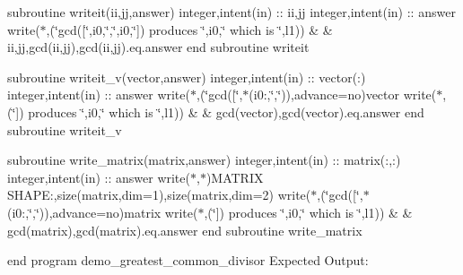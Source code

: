 subroutine writeit(ii,jj,answer) integer,intent(in) \+:\+: ii,jj integer,intent(in) \+:\+: answer write($\ast$,\textquotesingle{}(\char`\"{}gcd(\mbox{[}\char`\"{},i0,\char`\"{},\char`\"{},i0,\char`\"{}\mbox{]}) produces \char`\"{},i0,\char`\"{} which is \char`\"{},l1)\textquotesingle{}) \& \& ii,jj,gcd(ii,jj),gcd(ii,jj).eq.\+answer end subroutine writeit

subroutine writeit\+\_\+v(vector,answer) integer,intent(in) \+:\+: vector(\+:) integer,intent(in) \+:\+: answer write($\ast$,\textquotesingle{}(\char`\"{}gcd(\mbox{[}\char`\"{},$\ast$(i0\+:,\char`\"{},\char`\"{}))\textquotesingle{},advance=\textquotesingle{}no\textquotesingle{})vector write($\ast$,\textquotesingle{}(\char`\"{}\mbox{]}) produces \char`\"{},i0,\char`\"{} which is \char`\"{},l1)\textquotesingle{}) \& \& gcd(vector),gcd(vector).eq.\+answer end subroutine writeit\+\_\+v

subroutine write\+\_\+matrix(matrix,answer) integer,intent(in) \+:\+: matrix(\+:,\+:) integer,intent(in) \+:\+: answer write($\ast$,$\ast$)\textquotesingle{}M\+A\+T\+R\+IX S\+H\+A\+PE\+:\textquotesingle{},size(matrix,dim=1),size(matrix,dim=2) write($\ast$,\textquotesingle{}(\char`\"{}gcd(\mbox{[}\char`\"{},$\ast$(i0\+:,\char`\"{},\char`\"{}))\textquotesingle{},advance=\textquotesingle{}no\textquotesingle{})matrix write($\ast$,\textquotesingle{}(\char`\"{}\mbox{]}) produces \char`\"{},i0,\char`\"{} which is \char`\"{},l1)\textquotesingle{}) \& \& gcd(matrix),gcd(matrix).eq.\+answer end subroutine write\+\_\+matrix

end program demo\+\_\+greatest\+\_\+common\+\_\+divisor Expected Output\+:

